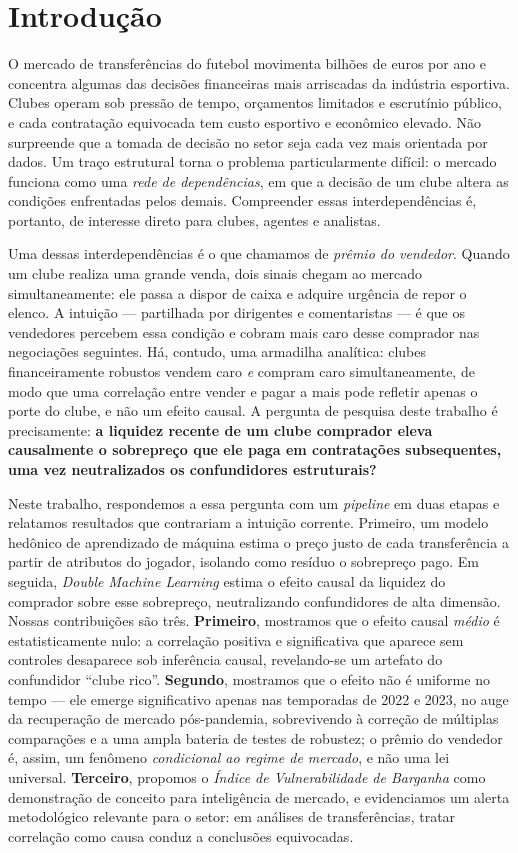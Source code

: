 \section{Introdução}

O mercado de transferências do futebol movimenta bilhões de euros por ano e concentra algumas das
decisões financeiras mais arriscadas da indústria esportiva. Clubes operam sob pressão de tempo,
orçamentos limitados e escrutínio público, e cada contratação equivocada tem custo esportivo e
econômico elevado. Não surpreende que a tomada de decisão no setor seja cada vez mais orientada por
dados. Um traço estrutural torna o problema particularmente difícil: o mercado funciona como uma
\textit{rede de dependências}, em que a decisão de um clube altera as condições enfrentadas pelos
demais. Compreender essas interdependências é, portanto, de interesse direto para clubes, agentes e
analistas.

Uma dessas interdependências é o que chamamos de \textit{prêmio do vendedor}. Quando um clube realiza
uma grande venda, dois sinais chegam ao mercado simultaneamente: ele passa a dispor de caixa e
adquire urgência de repor o elenco. A intuição — partilhada por dirigentes e comentaristas — é que os
vendedores percebem essa condição e cobram mais caro desse comprador nas negociações seguintes. Há,
contudo, uma armadilha analítica: clubes financeiramente robustos vendem caro \textit{e} compram caro
simultaneamente, de modo que uma correlação entre vender e pagar a mais pode refletir apenas o porte
do clube, e não um efeito causal. A pergunta de pesquisa deste trabalho é precisamente:
\textbf{a liquidez recente de um clube comprador eleva causalmente o sobrepreço que ele paga em
contratações subsequentes, uma vez neutralizados os confundidores estruturais?}

Neste trabalho, respondemos a essa pergunta com um \textit{pipeline} em duas etapas e relatamos
resultados que contrariam a intuição corrente. Primeiro, um modelo hedônico de aprendizado de máquina
estima o preço justo de cada transferência a partir de atributos do jogador, isolando como resíduo o
sobrepreço pago. Em seguida, \textit{Double Machine Learning} estima o efeito causal da liquidez do
comprador sobre esse sobrepreço, neutralizando confundidores de alta dimensão. Nossas contribuições
são três. \textbf{Primeiro}, mostramos que o efeito causal \textit{médio} é estatisticamente nulo: a
correlação positiva e significativa que aparece sem controles desaparece sob inferência causal,
revelando-se um artefato do confundidor ``clube rico''. \textbf{Segundo}, mostramos que o efeito não
é uniforme no tempo — ele emerge significativo apenas nas temporadas de 2022 e 2023, no auge da
recuperação de mercado pós-pandemia, sobrevivendo à correção de múltiplas comparações e a uma ampla
bateria de testes de robustez; o prêmio do vendedor é, assim, um fenômeno \textit{condicional ao
regime de mercado}, e não uma lei universal. \textbf{Terceiro}, propomos o \textit{Índice de
Vulnerabilidade de Barganha} como demonstração de conceito para inteligência de mercado, e
evidenciamos um alerta metodológico relevante para o setor: em análises de transferências, tratar
correlação como causa conduz a conclusões equivocadas.

